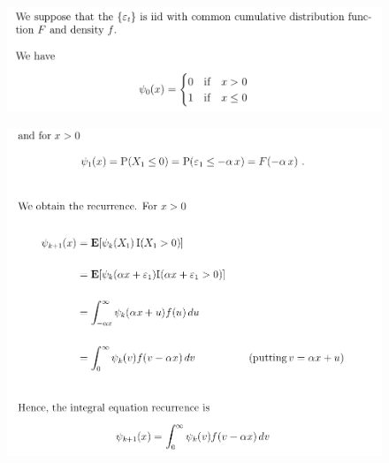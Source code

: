 \documentclass[c, dvipsnames, 8pt]{beamer}
\begin{document}
\begin{frame}[shrink=5]
	\frametitle{\insertsection} 


	\begin{figure}
		\centering
		\includegraphics[width=1\linewidth]{screenshot035}
		\label{fig:screenshot001}
	\end{figure}
	
	\begin{figure}
		\centering
		\includegraphics[width=1\linewidth]{screenshot039}
		\label{fig:screenshot001}
	\end{figure}





\end{frame}
\end{document}
